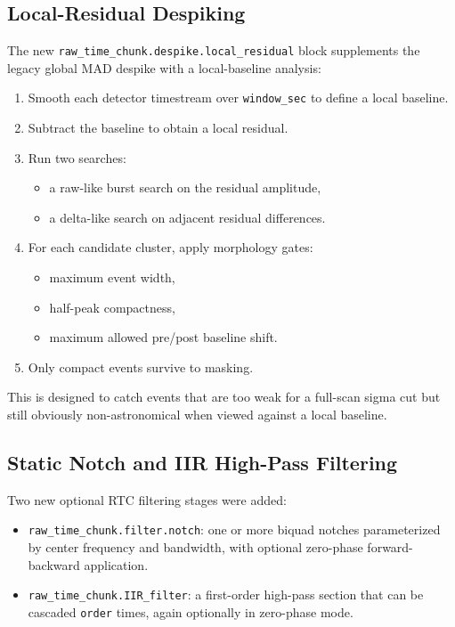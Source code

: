 \documentclass[11pt]{article}
\begin{document}
\subsection{Local-Residual Despiking}

The new \texttt{raw\_time\_chunk.despike.local\_residual} block supplements the
legacy global MAD despike with a local-baseline analysis:

\begin{enumerate}[leftmargin=1.5em]
\item Smooth each detector timestream over \texttt{window\_sec} to define a
local baseline.
\item Subtract the baseline to obtain a local residual.
\item Run two searches:
\begin{itemize}[leftmargin=1.5em]
\item a raw-like burst search on the residual amplitude,
\item a delta-like search on adjacent residual differences.
\end{itemize}
\item For each candidate cluster, apply morphology gates:
\begin{itemize}[leftmargin=1.5em]
\item maximum event width,
\item half-peak compactness,
\item maximum allowed pre/post baseline shift.
\end{itemize}
\item Only compact events survive to masking.
\end{enumerate}

This is designed to catch events that are too weak for a full-scan sigma cut
but still obviously non-astronomical when viewed against a local baseline.

\subsection{Static Notch and IIR High-Pass Filtering}

Two new optional RTC filtering stages were added:

\begin{itemize}[leftmargin=1.5em]
\item \texttt{raw\_time\_chunk.filter.notch}: one or more biquad notches
parameterized by center frequency and bandwidth, with optional zero-phase
forward-backward application.
\item \texttt{raw\_time\_chunk.IIR\_filter}: a first-order high-pass section
that can be cascaded \texttt{order} times, again optionally in zero-phase
mode.
\end{itemize}
\end{document}
